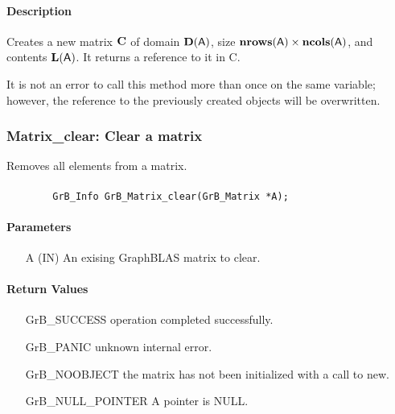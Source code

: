 \paragraph{Description}

Creates a new matrix ${\bf C}$ of domain $\bold{D}({\sf A})$, size 
$\bold{nrows}({\sf A}) \times \bold{ncols}({\sf A})$, and contents 
$\bold{L}({\sf A})$. It returns a reference to it in {\sf C}.

It is not an error to call this method more than once on the same variable;  
however, the reference to the previously created objects will be overwritten. 

\subsubsection{{\sf Matrix\_clear}: Clear a matrix}

Removes all elements from a matrix.

\paragraph{\syntax}

\begin{verbatim}
        GrB_Info GrB_Matrix_clear(GrB_Matrix *A);
\end{verbatim}

\paragraph{Parameters}

\begin{itemize}[leftmargin=1.1in]
    \item[{\sf A}] ({\sf IN}) An exising GraphBLAS matrix to clear.
\end{itemize}

\paragraph{Return Values}

\begin{itemize}[leftmargin=2.1in]
\item[{\sf GrB\_SUCCESS}]   operation completed successfully.
\item[{\sf GrB\_PANIC}]     unknown internal error.
\item[{\sf GrB\_NOOBJECT}]  the matrix has not been initialized with a call to new.
\item[{\sf GrB\_NULL\_POINTER}]    {\sf A} pointer is {\sf NULL}.
\end{itemize}

